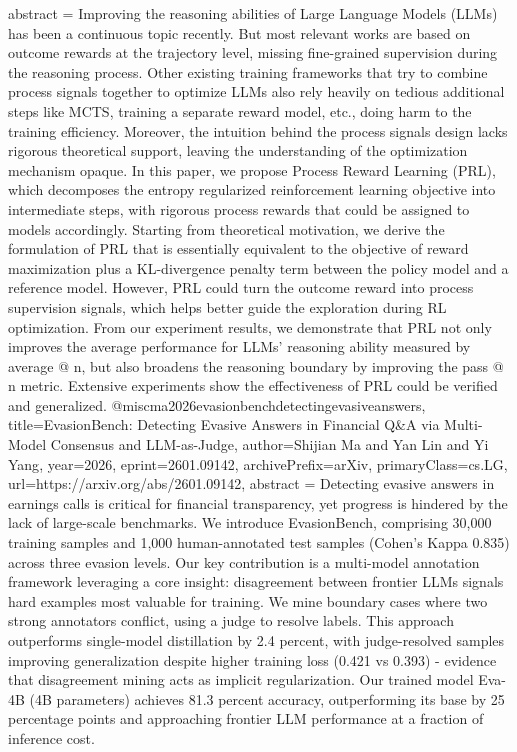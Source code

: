 {      abstract = {Improving the reasoning abilities of Large Language Models (LLMs) has been a continuous topic recently. But most relevant works are based on outcome rewards at the trajectory level, missing fine-grained supervision during the reasoning process. Other existing training frameworks that try to combine process signals together to optimize LLMs also rely heavily on tedious additional steps like MCTS, training a separate reward model, etc., doing harm to the training efficiency. Moreover, the intuition behind the process signals design lacks rigorous theoretical support, leaving the understanding of the optimization mechanism opaque. In this paper, we propose Process Reward Learning (PRL), which decomposes the entropy regularized reinforcement learning objective into intermediate steps, with rigorous process rewards that could be assigned to models accordingly. Starting from theoretical motivation, we derive the formulation of PRL that is essentially equivalent to the objective of reward maximization plus a KL-divergence penalty term between the policy model and a reference model. However, PRL could turn the outcome reward into process supervision signals, which helps better guide the exploration during RL optimization. From our experiment results, we demonstrate that PRL not only improves the average performance for LLMs' reasoning ability measured by average @ n, but also broadens the reasoning boundary by improving the pass @ n metric. Extensive experiments show the effectiveness of PRL could be verified and generalized.}
}@misc{ma2026evasionbenchdetectingevasiveanswers,
      title={EvasionBench: Detecting Evasive Answers in Financial Q&A via Multi-Model Consensus and LLM-as-Judge}, 
      author={Shijian Ma and Yan Lin and Yi Yang},
      year={2026},
      eprint={2601.09142},
      archivePrefix={arXiv},
      primaryClass={cs.LG},
      url={https://arxiv.org/abs/2601.09142},
      abstract = {Detecting evasive answers in earnings calls is critical for financial transparency, yet progress is hindered by the lack of large-scale benchmarks. We introduce EvasionBench, comprising 30,000 training samples and 1,000 human-annotated test samples (Cohen's Kappa 0.835) across three evasion levels. Our key contribution is a multi-model annotation framework leveraging a core insight: disagreement between frontier LLMs signals hard examples most valuable for training. We mine boundary cases where two strong annotators conflict, using a judge to resolve labels. This approach outperforms single-model distillation by 2.4 percent, with judge-resolved samples improving generalization despite higher training loss (0.421 vs 0.393) - evidence that disagreement mining acts as implicit regularization. Our trained model Eva-4B (4B parameters) achieves 81.3 percent accuracy, outperforming its base by 25 percentage points and approaching frontier LLM performance at a fraction of inference cost.}
}
